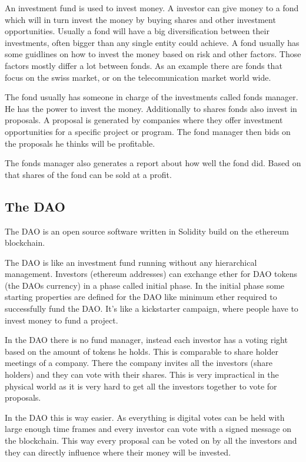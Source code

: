 \documentclass[a4paper, 11pt]{scrartcl}
\begin{document}
An investment fund is used to invest money. A investor can give money to a fond which will in turn invest the money by buying shares and other investment opportunities. Usually a fond will have a big diversification between their investments, often bigger than any single entity could achieve. A fond usually has some guidlines on how to invest the money based on risk and other factors. Those factors mostly differ a lot between fonds. As an example there are fonds that focus on the swiss market, or on the telecomunication market world wide.

The fond usually has someone in charge of the investments called fonds manager. He has the power to invest the money. Additionally to shares fonds also invest in proposals. A proposal is generated by companies where they offer investment opportunities for a specific project or program. The fond manager then bids on the proposals he thinks will be profitable.

The fonds manager also generates a report about how well the fond did. Based on that shares of the fond can be sold at a profit. 

\subsection{The DAO}

The DAO is an open source software written in Solidity build on the ethereum blockchain.

The DAO is like an investment fund running without any hierarchical management.
Investors (ethereum addresses) can exchange ether for DAO tokens (the DAOs currency) in a phase called initial phase. In the initial phase some starting properties are defined for the DAO like minimum ether required to successfully fund the DAO. It's like a kickstarter campaign, where people have to invest money to fund a project.

In the DAO there is no fund manager, instead each investor has a voting right based on the amount of tokens he holds. This is comparable to share holder meetings of a company. There the company invites all the investors (share holders) and they can vote with their shares. This is very impractical in the physical world as it is very hard to get all the investors together to vote for proposals. 

In the DAO this is way easier. As everything is digital votes can be held with large enough time frames and every investor can vote with a signed message on the blockchain. This way every proposal can be voted on by all the investors and they can directly influence where their money will be invested. 
\end{document}
